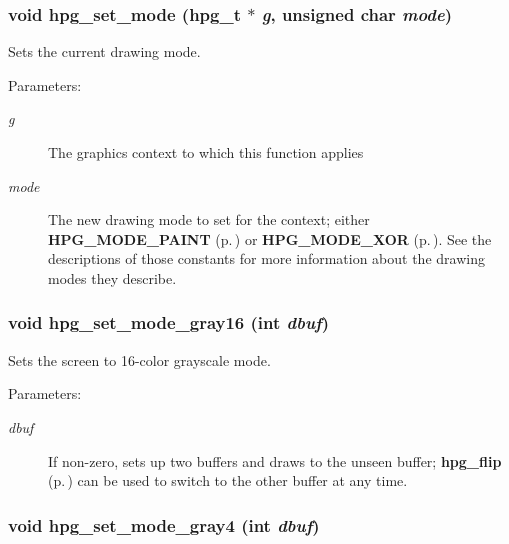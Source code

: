 \subsubsection{\setlength{\rightskip}{0pt plus 5cm}void hpg\_\-set\_\-mode ({\bf hpg\_\-t} $\ast$ {\em g}, unsigned char {\em mode})}\label{hpgraphics_8h_a65}


Sets the current drawing mode.

\begin{Desc}
\item[Parameters: ]\par
\begin{description}
\item[{\em 
g}]The graphics context to which this function applies \item[{\em 
mode}]The new drawing mode to set for the context; either {\bf HPG\_\-MODE\_\-PAINT} {\rm (p.\,\pageref{hpgraphics_8h_a0})} or {\bf HPG\_\-MODE\_\-XOR} {\rm (p.\,\pageref{hpgraphics_8h_a1})}. See the descriptions of those constants for more information about the drawing modes they describe. \end{description}
\end{Desc}
\subsubsection{\setlength{\rightskip}{0pt plus 5cm}void hpg\_\-set\_\-mode\_\-gray16 (int {\em dbuf})}\label{hpgraphics_8h_a32}


Sets the screen to 16-color grayscale mode.

\begin{Desc}
\item[Parameters: ]\par
\begin{description}
\item[{\em 
dbuf}]If non-zero, sets up two buffers and draws to the unseen buffer; {\bf hpg\_\-flip} {\rm (p.\,\pageref{hpgraphics_8h_a34})} can be used to switch to the other buffer at any time. \end{description}
\end{Desc}
\subsubsection{\setlength{\rightskip}{0pt plus 5cm}void hpg\_\-set\_\-mode\_\-gray4 (int {\em dbuf})}\label{hpgraphics_8h_a31}


